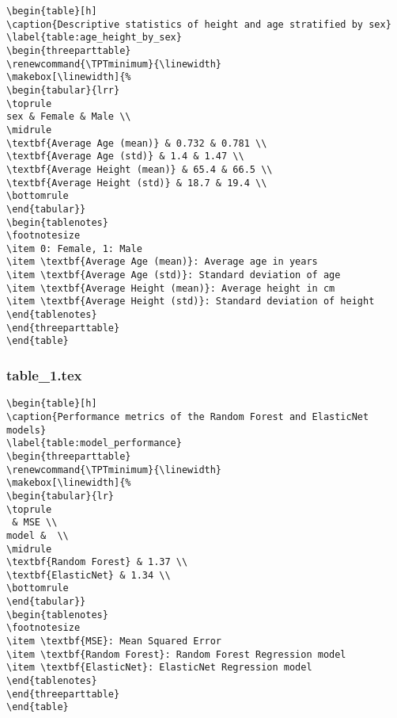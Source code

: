 \documentclass[11pt]{article}
\begin{document}
\begin{Verbatim}[tabsize=4]
\begin{table}[h]
\caption{Descriptive statistics of height and age stratified by sex}
\label{table:age_height_by_sex}
\begin{threeparttable}
\renewcommand{\TPTminimum}{\linewidth}
\makebox[\linewidth]{%
\begin{tabular}{lrr}
\toprule
sex & Female & Male \\
\midrule
\textbf{Average Age (mean)} & 0.732 & 0.781 \\
\textbf{Average Age (std)} & 1.4 & 1.47 \\
\textbf{Average Height (mean)} & 65.4 & 66.5 \\
\textbf{Average Height (std)} & 18.7 & 19.4 \\
\bottomrule
\end{tabular}}
\begin{tablenotes}
\footnotesize
\item 0: Female, 1: Male
\item \textbf{Average Age (mean)}: Average age in years
\item \textbf{Average Age (std)}: Standard deviation of age
\item \textbf{Average Height (mean)}: Average height in cm
\item \textbf{Average Height (std)}: Standard deviation of height
\end{tablenotes}
\end{threeparttable}
\end{table}

\end{Verbatim}

\subsubsection*{table\_1.tex}

\begin{Verbatim}[tabsize=4]
\begin{table}[h]
\caption{Performance metrics of the Random Forest and ElasticNet models}
\label{table:model_performance}
\begin{threeparttable}
\renewcommand{\TPTminimum}{\linewidth}
\makebox[\linewidth]{%
\begin{tabular}{lr}
\toprule
 & MSE \\
model &  \\
\midrule
\textbf{Random Forest} & 1.37 \\
\textbf{ElasticNet} & 1.34 \\
\bottomrule
\end{tabular}}
\begin{tablenotes}
\footnotesize
\item \textbf{MSE}: Mean Squared Error
\item \textbf{Random Forest}: Random Forest Regression model
\item \textbf{ElasticNet}: ElasticNet Regression model
\end{tablenotes}
\end{threeparttable}
\end{table}

\end{Verbatim}
\end{document}
